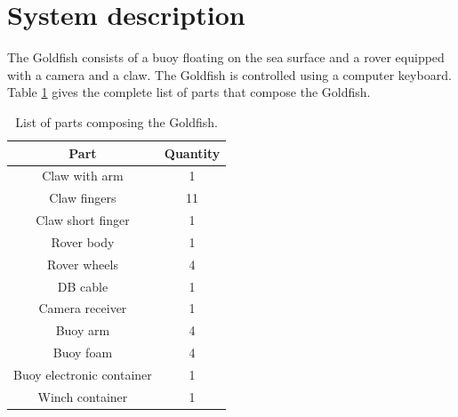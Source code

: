 \documentclass[letterpaper, 12 pt]{article}
\begin{document}
\section{System description}
The Goldfish consists of a buoy floating on the sea surface and a rover equipped with a camera and a claw. The Goldfish is controlled using a computer keyboard. Table \ref{tab:components} gives the complete list of parts that compose the Goldfish.
\begin{table}[H]
\begin{center}
\caption{List of parts composing the Goldfish.}
\label{tab:components}
\vspace{0.5cm}
\begin{tabular}{|c|c|}
\hline
\textbf{Part} & \textbf{Quantity}\\
\hline
Claw with arm & 1\\
\hline
Claw fingers & 11\\
\hline
Claw short finger & 1\\
\hline
Rover body & 1\\
\hline
Rover wheels & 4\\
\hline
DB cable & 1\\
\hline
Camera receiver & 1\\
\hline
Buoy arm & 4\\
\hline
Buoy foam & 4\\
\hline
Buoy electronic container & 1\\
\hline
Winch container & 1\\
\hline

\hline


\end{tabular}
\end{center}
\end{table}
\end{document}
